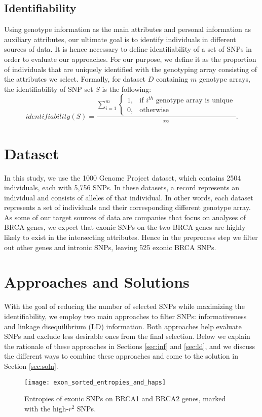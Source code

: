 \documentclass[14pt, oneside]{article}   	%
\begin{document}
\subsection{Identifiability}
Using genotype information as the main attributes and personal information as auxiliary attributes,
our ultimate goal is to identify individuals in different sources of data.
It is hence necessary to define identifiability of a set of SNPs in order to evaluate our approaches.
For our purpose, we define it as the proportion of individuals
that are uniquely identified with the genotyping array consisting of the attributes we select.
Formally, for dataset $D$ containing $m$ genotype arrays, the identifiability of SNP set $S$ is the following:
\[
identifiability(S) = \frac{\sum\limits_{i = 1}^{m}
\begin{cases}
1, & \text{if } i^{th} \text{ genotype array is unique}\\
0, & \text{otherwise}
\end{cases}
}
{m} .
\]
%
\section{Dataset}
In this study, we use the 1000 Genome Project dataset, which contains 2504 individuals, each with 5,756 SNPs.
In these datasets, a record represents an individual and consists of alleles of that individual.
In other words, each dataset represents a set of individuals and their corresponding different genotype array.
As some of our target sources of data are companies that focus on analyses of BRCA genes,
we expect that exonic SNPs on the two BRCA genes are highly likely to exist in the intersecting attributes.
Hence in the preprocess step we filter out other genes and intronic SNPs, leaving 525 exonic BRCA SNPs.

\section{Approaches and Solutions}\label{sec:app_and_soln}
With the goal of reducing the number of selected SNPs while maximizing the identifiability,
we employ two main approaches to filter SNPs: informativeness and linkage disequilibrium (LD) information.
Both approaches help evaluate SNPs and exclude less desirable ones from the final selection.
Below we explain the rationale of these approaches in Sections \ref{sec:inf} and \ref{sec:ld},
and we discuss the different ways to combine these approaches and come to the solution in Section \ref{sec:soln}.
\begin{figure}[t]
\centering
\texttt{[image: exon\_sorted\_entropies\_and\_haps]}
\caption{Entropies of exonic SNPs on BRCA1 and BRCA2 genes, marked with the high-$r^2$ SNPs.}
\label{fig:ents_haps}
\end{figure}
\end{document}
